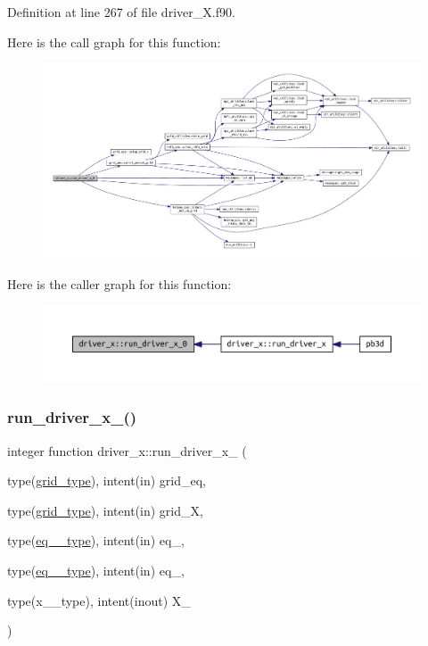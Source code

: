Definition at line 267 of file driver\+\_\+\+X.\+f90.

Here is the call graph for this function\+:\nopagebreak
\begin{figure}[H]
\begin{center}
\leavevmode
\includegraphics[width=350pt]{namespacedriver__x_a2b82a9bc6c0f4af9f3468d03fedc008e_cgraph}
\end{center}
\end{figure}
Here is the caller graph for this function\+:\nopagebreak
\begin{figure}[H]
\begin{center}
\leavevmode
\includegraphics[width=350pt]{namespacedriver__x_a2b82a9bc6c0f4af9f3468d03fedc008e_icgraph}
\end{center}
\end{figure}
\mbox{\label{namespacedriver__x_a454779cefa6da3714d32eedcec0ef7de}} 
\subsubsection{\texorpdfstring{run\+\_\+driver\+\_\+x\+\_()}{run\_driver\_x\_1()}}
{\footnotesize\ttfamily integer function driver\+\_\+x\+::run\+\_\+driver\+\_\+x\+\_ (\begin{DoxyParamCaption}\item[{type(\hyperlink{structgrid__vars_1_1grid__type}{grid\+\_\+type}), intent(in)}]{grid\+\_\+eq,  }\item[{type(\hyperlink{structgrid__vars_1_1grid__type}{grid\+\_\+type}), intent(in)}]{grid\+\_\+X,  }\item[{type(\hyperlink{structeq__vars_1_1eq__1__type}{eq\+\_\+1\+\_\+type}), intent(in)}]{eq\+\_,  }\item[{type(\hyperlink{structeq__vars_1_1eq__2__type}{eq\+\_\+2\+\_\+type}), intent(in)}]{eq\+\_,  }\item[{type(x\+\_\+1\+\_\+type), intent(inout)}]{X\+\_ }\end{DoxyParamCaption})}



